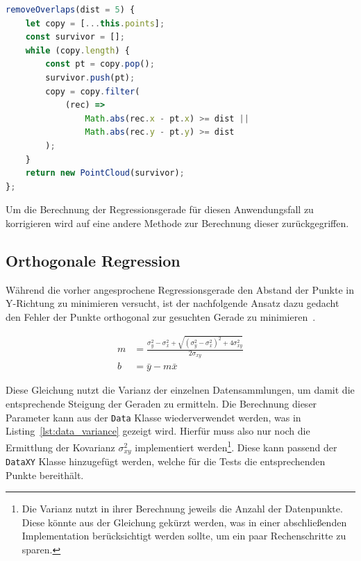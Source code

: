 \begin{lstlisting}[language=JavaScript, caption={Definition der \lstinline{removeOverlaps} Funktion der \lstinline{PointCloud} Klasse.}, label={lst:pointcloud_removeOverlaps}]
removeOverlaps(dist = 5) {
    let copy = [...this.points];
    const survivor = [];
    while (copy.length) {
        const pt = copy.pop();
        survivor.push(pt);
        copy = copy.filter(
            (rec) =>
                Math.abs(rec.x - pt.x) >= dist ||
                Math.abs(rec.y - pt.y) >= dist
        );
    }
    return new PointCloud(survivor);
};
\end{lstlisting}

Um die Berechnung der Regressionsgerade für diesen Anwendungsfall zu korrigieren wird auf eine andere Methode zur Berechnung dieser zurückgegriffen.

\subsection{Orthogonale Regression}\label{ch:orthogonale_regression}

Während die vorher angesprochene Regressionsgerade den Abstand der Punkte in Y-Richtung zu minimieren versucht, ist der nachfolgende Ansatz dazu gedacht den Fehler der Punkte orthogonal zur gesuchten Gerade zu minimieren~\cite[S.~140]{JuergenHedderich2020}.

\begin{equation}
    \begin{split}
        m &= \frac{\sigma_y^2 - \sigma_x^2 + \sqrt{(\sigma_y^2 - \sigma_x^2)^2 + 4\sigma_{xy}^2}}{2\sigma_{xy}} \\
        b &= \bar{y} - m \bar{x}
    \end{split}
    \label{eq:orthogonal_regression}
\end{equation}

Diese Gleichung nutzt die Varianz der einzelnen Datensammlungen, um damit die entsprechende Steigung der Geraden zu ermitteln.
Die Berechnung dieser Parameter kann aus der \lstinline{Data} Klasse wiederverwendet werden, was in Listing~\ref{lst:data_variance} gezeigt wird.
Hierfür muss also nur noch die Ermittlung der Kovarianz $\sigma_{xy}^2$ implementiert werden\footnote{Die Varianz nutzt in ihrer Berechnung jeweils die Anzahl der Datenpunkte. Diese könnte aus der Gleichung gekürzt werden, was in einer abschlie{\ss}enden Implementation berücksichtigt werden sollte, um ein paar Rechenschritte zu sparen.}.
Diese kann passend der \lstinline{DataXY} Klasse hinzugefügt werden, welche für die Tests die entsprechenden Punkte bereithält.

